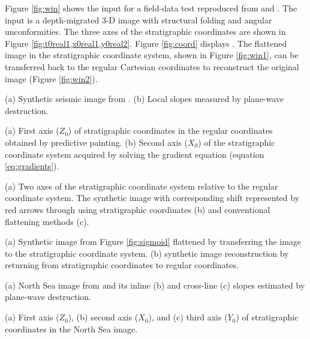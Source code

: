 Figure \ref{fig:win} shows the input  for a field-data test reproduced from \cite{lomask2006} and \cite{sergeyfomel2010}. The input is a depth-migrated 3-D image with structural folding and angular unconformities.  The three axes of the stratigraphic coordinates are shown in Figure \ref{fig:t0real1,x0real1,y0real2}. Figure \ref{fig:coord} displays . The flattened image in the stratigraphic coordinate system, shown in Figure \ref{fig:win1}, can be transferred back to the regular Cartesian coordinates to reconstruct the original image (Figure \ref{fig:win2}). 



{(a) Synthetic seismic image from \cite{claerbout2006}. (b) Local slopes measured by plane-wave destruction.}


{(a) First axis ($Z_0$) of stratigraphic coordinates in the regular coordinates obtained by predictive painting. (b) Second axis ($X_0$) of the stratigraphic coordinate system acquired by solving the gradient equation (equation \ref{eq:gradients}).}


{(a) Two axes of the stratigraphic coordinate system relative to the regular coordinate system.  The synthetic image with corresponding shift represented by red arrows through using stratigraphic coordinates (b)\old{,} and conventional flattening methods (c).}


{(a) Synthetic image from Figure \ref{fig:sigmoid} flattened by transferring the image to the stratigraphic coordinate system. (b)  synthetic image reconstruction by returning from stratigraphic coordinates to regular coordinates.}
 

{(a) North Sea image from \cite{lomask2006} and its inline (b) and cross-line (c) slopes estimated by plane-wave destruction.}



{(a) First axis ($Z_0$), (b) second axis ($X_0$), and (c) third axis ($Y_0$) of stratigraphic coordinates in the North Sea image.}


